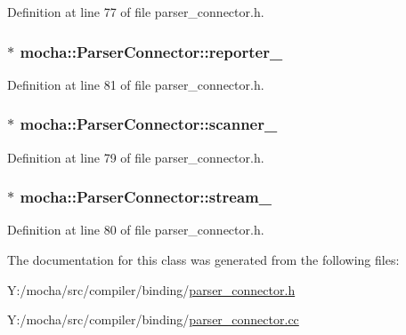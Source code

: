 Definition at line 77 of file parser\_\-connector.h.

\hypertarget{classmocha_1_1_parser_connector_a51939c1f93bc2a8e712ebce930813842}{
\subsubsection[{reporter\_\-}]{$\ast$ {\bf mocha::ParserConnector::reporter\_\-}}}
\label{classmocha_1_1_parser_connector_a51939c1f93bc2a8e712ebce930813842}


Definition at line 81 of file parser\_\-connector.h.

\hypertarget{classmocha_1_1_parser_connector_a5927a8f3e5eb29338c8d1383567f421a}{
\subsubsection[{scanner\_\-}]{$\ast$ {\bf mocha::ParserConnector::scanner\_\-}}}
\label{classmocha_1_1_parser_connector_a5927a8f3e5eb29338c8d1383567f421a}


Definition at line 79 of file parser\_\-connector.h.

\hypertarget{classmocha_1_1_parser_connector_a23cf641fda330704baab22e6c9208db8}{
\subsubsection[{stream\_\-}]{$\ast$ {\bf mocha::ParserConnector::stream\_\-}}}
\label{classmocha_1_1_parser_connector_a23cf641fda330704baab22e6c9208db8}


Definition at line 80 of file parser\_\-connector.h.



The documentation for this class was generated from the following files:\begin{DoxyCompactItemize}
\item 
Y:/mocha/src/compiler/binding/\hyperlink{parser__connector_8h}{parser\_\-connector.h}\item 
Y:/mocha/src/compiler/binding/\hyperlink{parser__connector_8cc}{parser\_\-connector.cc}\end{DoxyCompactItemize}
